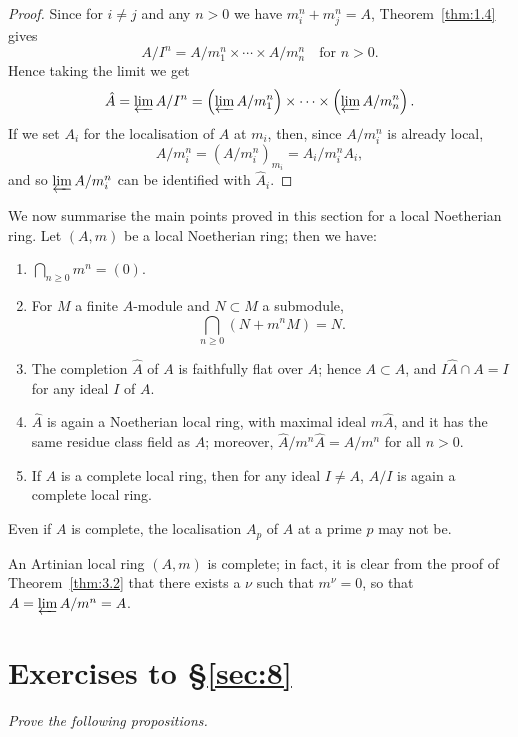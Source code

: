 \begin{proof}
Since for $i \neq j$ and any $n > 0$ we have $m_i^n + m_j^n = A$, Theorem~\ref{thm:1.4}
gives
\[
  A/I^n = A/m_1^n \times \cdots \times A/m_n^n \quad \text{for } n > 0.
\]
Hence taking the limit we get
\[
  \hat{A} = \varprojlim A/I^n = \left(\varprojlim A/m_1^n\right) \times \cdots \times \left(\varprojlim A/m_n^n\right).
\]
If we set $A_i$ for the localisation of $A$ at $m_i$, then, since $A/m_i^n$ is already local,
\[
  A/m_i^n = (A/m_i^n)_{m_i} = A_i/m_i^nA_i,
\]
and so $\varprojlim A/m_i^n$ can be identified with $\hat{A}_i$.
\end{proof}

We now summarise the main points proved in this section for a local
Noetherian ring. Let $(A, m)$ be a local Noetherian ring; then we have:
\begin{enumerate}[(1)]
  \item $\bigcap_{n \ge 0} m^n = (0)$.
  \item For $M$ a finite $A$-module and $N \subset M$ a submodule,
        \[
          \bigcap_{n \ge 0} (N + m^nM) = N.
        \]
  \item The completion $\hat{A}$ of $A$ is faithfully flat over $A$; hence $A \subset \hat{A}$, and
        $I\hat{A} \cap A = I$ for any ideal $I$ of $A$.
  \item $\hat{A}$ is again a Noetherian local ring, with maximal ideal $m\hat{A}$, and it has
        the same residue class field as $A$; moreover, $\hat{A}/m^n\hat{A} = A/m^n$ for all $n > 0$.
  \item If $A$ is a complete local ring, then for any ideal $I \neq A$, $A/I$ is again a
        complete local ring.
\end{enumerate}

\begin{remark}
Even if $A$ is complete, the localisation $A_p$ of $A$ at a prime $p$ may
not be.
\end{remark}

\begin{remark}
An Artinian local ring $(A, m)$ is complete; in fact, it is clear from
the proof of Theorem~\ref{thm:3.2} that there exists a $\nu$ such that $m^\nu = 0$, so that
$A = \varprojlim A/m^n = A$.
\end{remark}

\section*{Exercises to \S\ref{sec:8}}
\emph{Prove the following propositions.}

